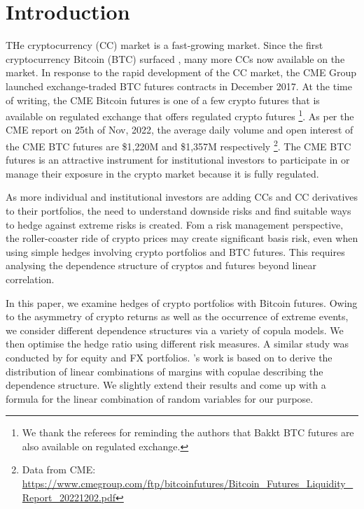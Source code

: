 \documentclass[11pt,a4paper,english]{article}
\begin{document}
\clearpage
\section{Introduction}\label{sec:introduction}
THe cryptocurrency (CC) market is a fast-growing market.
Since the first cryptocurrency Bitcoin (BTC) surfaced \citep{nakamoto2009}, 
many more CCs now available on the market.
In response to the rapid development of the CC market, the CME Group
launched exchange-traded BTC futures contracts in December
2017.
At the time of writing, the CME Bitcoin futures is one of a few crypto futures that is available on regulated exchange that offers
regulated crypto futures \footnote{We thank the referees for reminding the authors that Bakkt BTC futures are also available on regulated exchange.}. 
As per the CME report on 25th of Nov, 2022, the average daily volume and open interest of the CME BTC futures are
\$1,220M and \$1,357M respectively \footnote{Data from CME: \url{https://www.cmegroup.com/ftp/bitcoinfutures/Bitcoin_Futures_Liquidity_Report_20221202.pdf}}.
The CME BTC futures is an attractive instrument for institutional investors to participate in or manage their exposure in the crypto
market because it is fully regulated. 

As more individual and institutional investors are adding CCs and CC
derivatives to their portfolios, the need to understand
downside risks and find suitable ways to hedge against extreme risks
is created. 
Fom a risk management perspective, the roller-coaster ride
of crypto prices may create significant basis risk, even when using
simple hedges involving crypto portfolios and BTC futures. This
requires analysing the dependence structure of cryptos and
futures beyond linear correlation. 

In this paper, we examine hedges of crypto portfolios
with Bitcoin futures. Owing to the asymmetry of crypto returns as
well as the occurrence of extreme events, we consider different 
dependence structures via a variety of copula models. We then optimise
the hedge ratio using different risk measures. A similar study was
conducted by \citep{barbi2014copula} for equity and FX portfolios.
\citet{barbi2014copula}'s work is based on \citet{cherubini2011copula}
to derive the distribution of linear combinations of margins with
copulae describing the dependence structure. We slightly extend their
results and come up with a formula for the linear combination of
random variables for our purpose.
\end{document}
